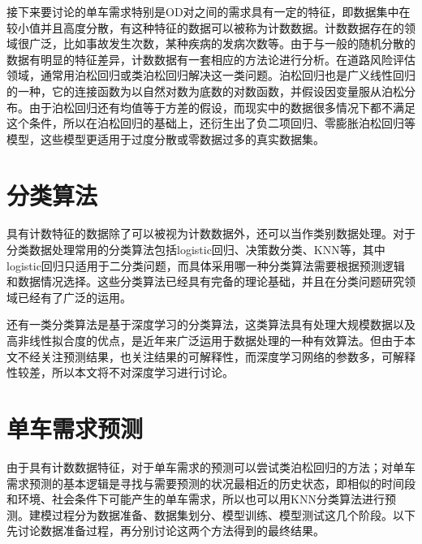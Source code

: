 \documentclass[]{tongjithesis}
\numberwithin{equation}{chapter}
\begin{document}
接下来要讨论的单车需求特别是OD对之间的需求具有一定的特征，即数据集中在较小值并且高度分散，有这种特征的数据可以被称为计数数据。计数数据存在的领域很广泛，比如事故发生次数，某种疾病的发病次数等。由于与一般的随机分散的数据有明显的特征差异，计数数据有一套相应的方法论进行分析。在道路风险评估领域，通常用泊松回归或类泊松回归解决这一类问题\cite{mannering2014analytic}。泊松回归也是广义线性回归的一种，它的连接函数为以自然对数为底数的对数函数，并假设因变量服从泊松分布。由于泊松回归还有均值等于方差的假设，而现实中的数据很多情况下都不满足这个条件，所以在泊松回归的基础上，还衍生出了负二项回归、零膨胀泊松回归等模型，这些模型更适用于过度分散或零数据过多的真实数据集。

\section{分类算法}
具有计数特征的数据除了可以被视为计数数据外，还可以当作类别数据处理\cite{lukusa2020horvitz}。对于分类数据处理常用的分类算法包括logistic回归、决策数分类、KNN等，其中logistic回归只适用于二分类问题，而具体采用哪一种分类算法需要根据预测逻辑和数据情况选择。这些分类算法已经具有完备的理论基础，并且在分类问题研究领域已经有了广泛的运用。

还有一类分类算法是基于深度学习的分类算法，这类算法具有处理大规模数据以及高非线性拟合度的优点，是近年来广泛运用于数据处理的一种有效算法。但由于本文不经关注预测结果，也关注结果的可解释性，而深度学习网络的参数多，可解释性较差，所以本文将不对深度学习进行讨论。

\section{单车需求预测}
由于具有计数数据特征，对于单车需求的预测可以尝试类泊松回归的方法；对单车需求预测的基本逻辑是寻找与需要预测的状况最相近的历史状态，即相似的时间段和环境、社会条件下可能产生的单车需求，所以也可以用KNN分类算法进行预测。建模过程分为数据准备、数据集划分、模型训练、模型测试这几个阶段。以下先讨论数据准备过程，再分别讨论这两个方法得到的最终结果。
\end{document}
